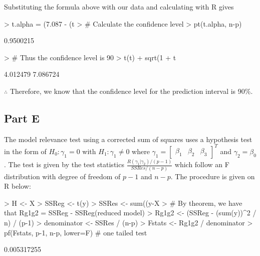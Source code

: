 \documentclass{article}
\begin{document}
\noindent Substituting the formula above with our data and calculating with R gives
\begin{Schunk}
\begin{Sinput}
> t.alpha = (7.087 - (t %
> # Calculate the confidence level
> pt(t.alpha, n-p)
\end{Sinput}
\begin{Soutput}
          [,1]
[1,] 0.9500215
\end{Soutput}
\begin{Sinput}
> # Thus the confidence level is 90%
> t(t) %
+   sqrt(1 + t %
\end{Sinput}
\begin{Soutput}
[1] 4.012479 7.086724
\end{Soutput}
\end{Schunk}

\noindent $\therefore$ Therefore, we know that the confidence level for the prediction interval is 90\%.

\subsection{Part E}
The model relevance test using a corrected sum of squares uses a hypothesis test in the form of $H_0: \gamma_1 = 0$ with $H_1: \gamma_1 \neq 0$ where $\gamma_1 = \begin{bmatrix} \beta_1 & \beta_2 & \beta_3 \end{bmatrix}^T$ and $\gamma_2 = \beta_0$. The test is given by the test statistics $\frac{R(\gamma_1 | \gamma_2)/(p-1)}{SSRes / (n-p)}$ which follow an F distribution with degree of freedom of $p-1$ and $n-p$. The procedure is given on R below:

\begin{Schunk}
\begin{Sinput}
> H <- X %
> SSReg <- t(y) %
> SSRes <- sum((y-X%
> # By theorem, we have that Rg1g2 = SSReg - SSReg(reduced model)
> Rg1g2 <- (SSReg - (sum(y))^2 / n) / (p-1)
> denominator <- SSRes / (n-p)
> Fstats <- Rg1g2 / denominator
> pf(Fstats, p-1, n-p, lower=F) # one tailed test
\end{Sinput}
\begin{Soutput}
            [,1]
[1,] 0.005317255
\end{Soutput}
\end{Schunk}
\end{document}
